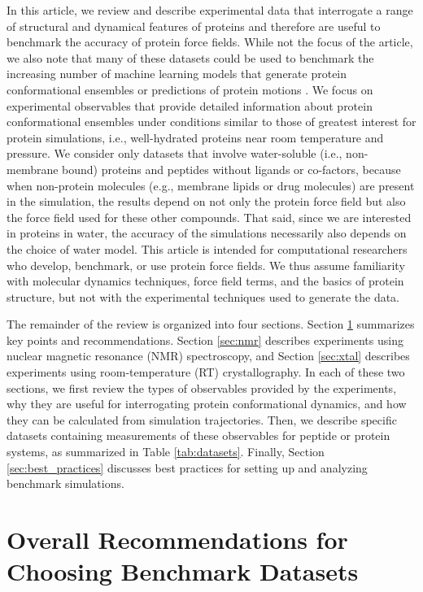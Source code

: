 \documentclass[9pt,review,pubversion]{livecoms}
\begin{document}
In this article, we review and describe experimental data that interrogate a range of structural and dynamical features of proteins and therefore are useful to benchmark the accuracy of protein force fields.
While not the focus of the article, we also note that many of these datasets could be used to benchmark the increasing number of machine learning models that generate protein conformational ensembles or predictions of protein motions \cite{janson2025generation,brownless2025generative}.
We focus on experimental observables that provide detailed information about protein conformational ensembles under conditions similar to those of greatest interest for protein simulations, i.e., well-hydrated proteins near room temperature and pressure.
We consider only datasets that involve water-soluble (i.e., non-membrane bound) proteins and peptides without ligands or co-factors, because when non-protein molecules (e.g., membrane lipids or drug molecules) are present in the simulation, the results depend on not only the protein force field but also the force field used for these other compounds.
That said, since we are interested in proteins in water, the accuracy of the simulations necessarily also depends on the choice of water model.
This article is intended for computational researchers who develop, benchmark, or use protein force fields.
We thus assume familiarity with molecular dynamics techniques, force field terms, and the basics of protein structure, but not with the experimental techniques used to generate the data.

The remainder of the review is organized into four sections.
Section \ref{sec:overall} summarizes key points and recommendations.
Section \ref{sec:nmr} describes experiments using nuclear magnetic resonance (NMR) spectroscopy, and Section \ref{sec:xtal} describes experiments using room-temperature (RT) crystallography.
In each of these two sections, we first review the types of observables provided by the experiments, why they are useful for interrogating protein conformational dynamics, and how they can be calculated from simulation trajectories.
Then, we describe specific datasets containing measurements of these observables for peptide or protein systems, as summarized in Table \ref{tab:datasets}.
Finally, Section \ref{sec:best_practices} discusses best practices for setting up and analyzing benchmark simulations.

\section{Overall Recommendations for Choosing Benchmark Datasets}
\label{sec:overall}
 
\end{document}

